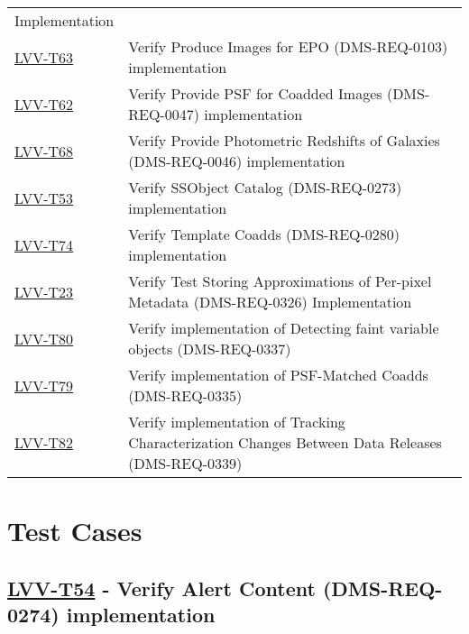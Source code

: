 \begin{longtable}[]{@{}ll@{}}
Implementation\tabularnewline
\protect\hyperlink{lvv-t63---verify-produce-images-for-epo-dms-req-0103-implementation}{LVV-T63}
& Verify Produce Images for EPO (DMS-REQ-0103)
implementation\tabularnewline
\protect\hyperlink{lvv-t62---verify-provide-psf-for-coadded-images-dms-req-0047-implementation}{LVV-T62}
& Verify Provide PSF for Coadded Images (DMS-REQ-0047)
implementation\tabularnewline
\protect\hyperlink{lvv-t68---verify-provide-photometric-redshifts-of-galaxies-dms-req-0046-implementation}{LVV-T68}
& Verify Provide Photometric Redshifts of Galaxies (DMS-REQ-0046)
implementation\tabularnewline
\protect\hyperlink{lvv-t53---verify-ssobject-catalog-dms-req-0273-implementation}{LVV-T53}
& Verify SSObject Catalog (DMS-REQ-0273) implementation\tabularnewline
\protect\hyperlink{lvv-t74---verify-template-coadds-dms-req-0280-implementation}{LVV-T74}
& Verify Template Coadds (DMS-REQ-0280) implementation\tabularnewline
\protect\hyperlink{lvv-t23---verify-test-storing-approximations-of-per-pixel-metadata-dms-req-0326-implementation}{LVV-T23}
& Verify Test Storing Approximations of Per-pixel Metadata
(DMS-REQ-0326) Implementation\tabularnewline
\protect\hyperlink{lvv-t80---verify-implementation-of-detecting-faint-variable-objects-dms-req-0337}{LVV-T80}
& Verify implementation of Detecting faint variable objects
(DMS-REQ-0337)\tabularnewline
\protect\hyperlink{lvv-t79---verify-implementation-of-psf-matched-coadds-dms-req-0335}{LVV-T79}
& Verify implementation of PSF-Matched Coadds
(DMS-REQ-0335)\tabularnewline
\protect\hyperlink{lvv-t82---verify-implementation-of-tracking-characterization-changes-between-data-releases-dms-req-0339}{LVV-T82}
& Verify implementation of Tracking Characterization Changes Between
Data Releases (DMS-REQ-0339)\tabularnewline
\bottomrule
\end{longtable}

\newpage
\hypertarget{test-cases}{%
\section{Test Cases}\label{test-cases}}

\hypertarget{lvv-t54---verify-alert-content-dms-req-0274-implementation}{%
\subsection{\texorpdfstring{\href{https://jira.lsstcorp.org/secure/Tests.jspa\#/testCase/LVV-T54}{LVV-T54}
- Verify Alert Content (DMS-REQ-0274)
implementation}{LVV-T54 - Verify Alert Content (DMS-REQ-0274) implementation}}\label{lvv-t54---verify-alert-content-dms-req-0274-implementation}}

